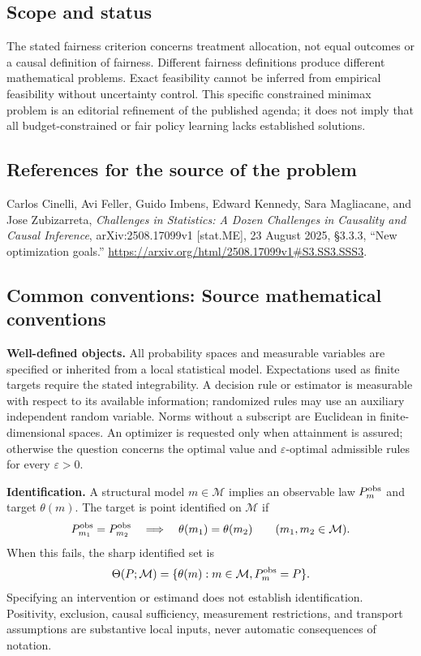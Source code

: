 \documentclass[11pt,a4paper]{article}
\begin{document}
\subsection*{Scope and status}
The stated fairness criterion concerns treatment allocation, not equal outcomes or a causal definition of fairness. Different fairness definitions produce different mathematical problems. Exact feasibility cannot be inferred from empirical feasibility without uncertainty control. This specific constrained minimax problem is an editorial refinement of the published agenda; it does not imply that all budget-constrained or fair policy learning lacks established solutions.
\subsection*{References for the source of the problem}
Carlos Cinelli, Avi Feller, Guido Imbens, Edward Kennedy, Sara Magliacane, and Jose Zubizarreta, \emph{Challenges in Statistics: A Dozen Challenges in Causality and Causal Inference}, arXiv:2508.17099v1 [stat.ME], 23 August 2025, \S3.3.3, ``New optimization goals.'' \url{https://arxiv.org/html/2508.17099v1#S3.SS3.SSS3}.

\subsection*{Common conventions: Source mathematical conventions}

\textbf{Well-defined objects.}
All probability spaces and measurable variables are specified or inherited
from a local statistical model. Expectations used as finite targets require
the stated integrability. A decision rule or estimator is measurable with
respect to its available information; randomized rules may use an auxiliary
independent random variable. Norms without a subscript are Euclidean in
finite-dimensional spaces. An optimizer is requested only when attainment
is assured; otherwise the question concerns the optimal value and
$\varepsilon$-optimal admissible rules for every $\varepsilon>0$.

\textbf{Identification.}
A structural model $m\in\mathcal M$ implies an observable law
$P_m^{\rm obs}$ and target $\theta(m)$. The target is point identified on
$\mathcal M$ if
\[
 P_{m_1}^{\rm obs}=P_{m_2}^{\rm obs}
 \quad\Longrightarrow\quad\theta(m_1)=\theta(m_2)
 \qquad(m_1,m_2\in\mathcal M).
\]
When this fails, the sharp identified set is
\[
 \Theta(P;\mathcal M)=\{\theta(m):m\in\mathcal M,
                                  P_m^{\rm obs}=P\}.
\]
Specifying an intervention or estimand does not establish identification.
Positivity, exclusion, causal sufficiency, measurement restrictions, and
transport assumptions are substantive local inputs, never automatic
consequences of notation.
\end{document}

